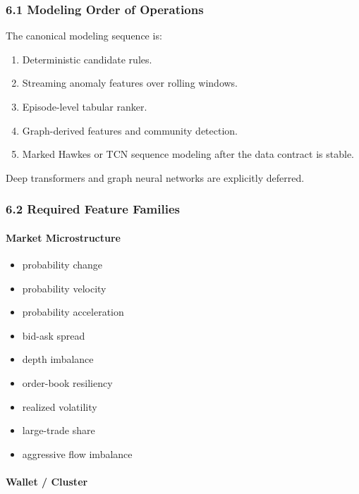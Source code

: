 \documentclass[
]{article}
\providecommand{\tightlist}{%
  \setlength{\itemsep}{0pt}\setlength{\parskip}{0pt}}
\begin{document}
\subsubsection{6.1 Modeling Order of
Operations}\label{61-modeling-order-of-operations}

The canonical modeling sequence is:

\begin{enumerate}
\def\labelenumi{\arabic{enumi}.}
\tightlist
\item
  Deterministic candidate rules.
\item
  Streaming anomaly features over rolling windows.
\item
  Episode-level tabular ranker.
\item
  Graph-derived features and community detection.
\item
  Marked Hawkes or TCN sequence modeling after the data contract is
  stable.
\end{enumerate}

Deep transformers and graph neural networks are explicitly deferred.

\subsubsection{6.2 Required Feature
Families}\label{62-required-feature-families}

\paragraph{Market Microstructure}\label{market-microstructure}

\begin{itemize}
\tightlist
\item
  probability change
\item
  probability velocity
\item
  probability acceleration
\item
  bid-ask spread
\item
  depth imbalance
\item
  order-book resiliency
\item
  realized volatility
\item
  large-trade share
\item
  aggressive flow imbalance
\end{itemize}

\paragraph{Wallet / Cluster}\label{wallet--cluster}
\end{document}
